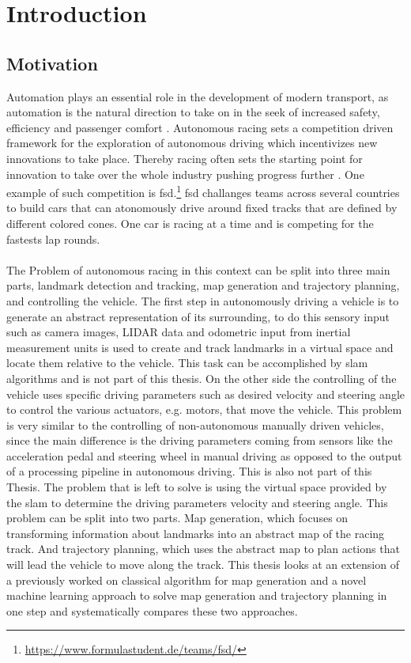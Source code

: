 \graphicspath{{Chapter/Figs/introduction/}}
\chapter{Introduction}

\section{Motivation}
Automation plays an essential role in the development of modern transport, as automation is the natural direction to take on in the seek of increased safety, efficiency and passenger comfort \cite{Lutin2018}. Autonomous racing sets a competition driven framework for the exploration of autonomous driving which incentivizes new innovations to take place. Thereby racing often sets the starting point for innovation to take over the whole industry pushing progress further \cite{Foxall91}. One example of such competition is \ac{fsd}.\footnote{\url{https://www.formulastudent.de/teams/fsd/}} \ac{fsd} challanges teams across several countries to build cars that can atonomously drive around fixed tracks that are defined by different colored cones. One car is racing at a time and is competing for the fastests lap rounds.\\
\\The Problem of autonomous racing in this context can be split into three main parts, landmark detection and tracking, map generation and trajectory planning, and controlling the vehicle. The first step in autonomously driving a vehicle is to generate an abstract representation of its surrounding, to do this sensory input such as camera images, LIDAR data and odometric input from inertial measurement units is used to create and track landmarks in a virtual space and locate them relative to the vehicle. This task can be accomplished by \ac{slam} algorithms \cite{Singandhupe2019} and is not part of this thesis. On the other side the controlling of the vehicle uses specific driving parameters such as desired velocity and steering angle to control the various actuators, e.g. motors, that move the vehicle. This problem is very similar to the controlling of non-autonomous manually driven vehicles, since the main difference is the driving parameters coming from sensors like the acceleration pedal and steering wheel in manual driving as opposed to the output of a processing pipeline in autonomous driving. This is also not part of this Thesis. The problem that is left to solve is using the virtual space provided by the \ac{slam} to determine the driving parameters velocity and steering angle. This problem can be split into two parts. Map generation, which focuses on transforming information about landmarks into an abstract map of the racing track. And trajectory planning, which uses the abstract map to plan actions that will lead the vehicle to move along the track. This thesis looks at an extension of a previously worked on classical algorithm for map generation and a novel machine learning approach to solve map generation and trajectory planning in one step and systematically compares these two approaches.\\
